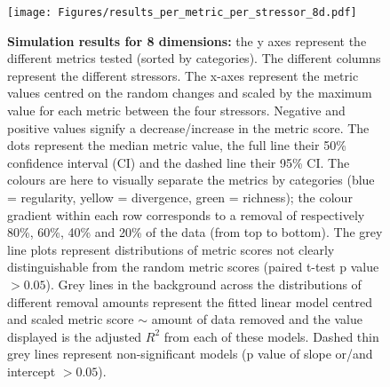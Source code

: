 \documentclass[12pt,letterpaper]{article}
\begin{document}
\begin{figure}[!htbp]
\centering
   \texttt{[image: Figures/results\_per\_metric\_per\_stressor\_8d.pdf]}
\caption{\scriptsize{\textbf{Simulation results for 8 dimensions:} the y axes represent the different metrics tested (sorted by categories).
The different columns represent the different stressors. The x-axes represent the metric values centred on the random changes and scaled by the maximum value for each metric between the four stressors.
Negative and positive values signify a decrease/increase in the metric score.
The dots represent the median metric value, the full line their 50\% confidence interval (CI) and the dashed line their 95\% CI.
The colours are here to visually separate the metrics by categories (blue = regularity, yellow = divergence, green = richness); the colour gradient within each row corresponds to a removal of respectively 80\%, 60\%, 40\% and 20\% of the data (from top to bottom).
The grey line plots represent distributions of metric scores not clearly distinguishable from the random metric scores (paired t-test p value $> 0.05$).
Grey lines in the background across the distributions of different removal amounts represent the fitted linear model centred and scaled metric score $\sim$ amount of data removed and the value displayed is the adjusted $R^2$ from each of these models.
Dashed thin grey lines represent non-significant models (p value of slope or/and intercept $> 0.05$).
}}
\label{Fig:simulation_results}
\end{figure}
\bigskip
\end{document}
